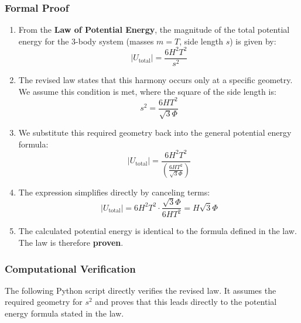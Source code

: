 \subsubsection*{Formal Proof}
\begin{enumerate}
    \item From the \textbf{Law of Potential Energy}, the magnitude of the total potential energy for the 3-body system (masses $m=T$, side length $s$) is given by:
    $$ |U_{\text{total}}| = \frac{6H^2T^2}{s^2} $$
    
    \item The revised law states that this harmony occurs only at a specific geometry. We assume this condition is met, where the square of the side length is:
    $$ s^2 = \frac{6HT^2}{\sqrt{3}\Phi} $$
    
    \item We substitute this required geometry back into the general potential energy formula:
    $$ |U_{\text{total}}| = \frac{6H^2T^2}{\left(\frac{6HT^2}{\sqrt{3}\Phi}\right)} $$
    
    \item The expression simplifies directly by canceling terms:
    $$ |U_{\text{total}}| = 6H^2T^2 \cdot \frac{\sqrt{3}\Phi}{6HT^2} = H\sqrt{3}\Phi $$
    
    \item The calculated potential energy is identical to the formula defined in the law. The law is therefore \textbf{proven}.
\end{enumerate}

\subsubsection*{Computational Verification}
The following Python script directly verifies the revised law. It assumes the required geometry for $s^2$ and proves that this leads directly to the potential energy formula stated in the law.

